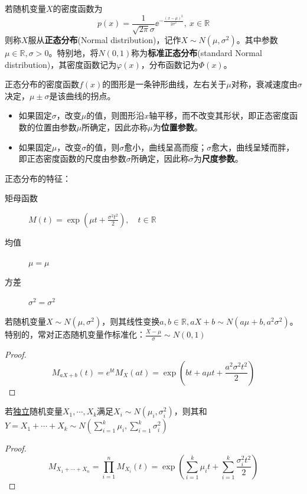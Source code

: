 \begin{definition}
    若随机变量$X$的密度函数为
    \[ p(x) = \frac1{\sqrt{2\pi}\sigma} \ee^{-\frac{(x-\mu)^2}{2\sigma^2}},\ x \in \mathbb{R} \]
    则称$X$服从\textbf{正态分布}(Normal distribution)，记作$X\sim N(\mu,\sigma^2)$。其中参数$\mu \in \mathbb{R},\sigma>0$。特别地，将$N(0,1)$称为\textbf{标准正态分布}(standard Normal distribution)，其密度函数记为$\varphi(x)$，分布函数记为$\Phi(x)$。
\end{definition}

正态分布的密度函数$f(x)$的图形是一条钟形曲线，左右关于$\mu$对称，衰减速度由$\sigma$决定，$\mu\pm\sigma$是该曲线的拐点。
\begin{itemize}
    \item 如果固定$\sigma$，改变$\mu$的值，则图形沿$x$轴平移，而不改变其形状，即正态密度函数的位置由参数$\mu$所确定，因此亦称$\mu$为\textbf{位置参数}。
    \item 如果固定$\mu$，改变$\sigma$的值，则$\sigma$愈小，曲线呈高而瘦；$\sigma$愈大，曲线呈矮而胖，即正态密度函数的尺度由参数$\sigma$所确定，因此称$\sigma$为\textbf{尺度参数}。
\end{itemize}

正态分布的特征：
\begin{description}
    \item[矩母函数] $M(t)=\exp (\mu t + \frac{\sigma^2 t^2}{2}), \quad t \in \mathbb{R}$
    \item[均值] $\mu=\mu$
    \item[方差] $\sigma^2=\sigma^2$
\end{description}

\begin{proposition}
    若随机变量$X \sim N(\mu, \sigma^2)$，则其线性变换$a,b \in \mathbb{R},aX + b \sim N(a \mu + b,a^2 \sigma^2)$。特别的，常对正态随机变量作标准化：$\frac{X-\mu}{\sigma} \sim N(0,1)$
\end{proposition}

\begin{proof}
    \[ M_{aX + b}(t)=e^{bt}M_X(a t)=\exp (bt + a \mu t+\frac{a^2 \sigma^2 t^2}{2}) \]
\end{proof}

\begin{proposition}
    若\underline{独立}随机变量$X_1,\cdots ,X_k$满足$ X_i \sim N(\mu_i,\sigma_i^2)$，则其和$Y=X_1+\cdots +X_k \sim N(\sum_{i=1}^k\mu_i,\sum_{i=1}^k\sigma_i^2)$
\end{proposition}

\begin{proof}
    \[ M_{X_1+\cdots+ X_n} = \prod_{i=1}^n M_{X_i}(t)=\exp (\sum_{i=1}^k\mu_i t + \sum_{i=1}^k \frac{\sigma_i^2 t^2}{2}) \]
\end{proof}

